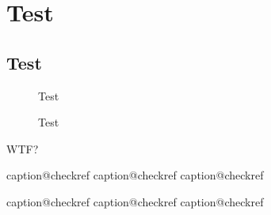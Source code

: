 \documentclass[
    a4paper, 
    oneside,
    ]{scrbook}
\begin{document}
\chapter{Test}  %
\section{Test}  %

\begin{figure}[!htbp]
    \centering
    \subfloat[{Test1}]
    {
        \rule{5cm}{2cm}
        \label{subfig:Test1_1}

        \hfill

        \rule{5cm}{2cm}
        \label{subfig:Test1_2}
    }
    \caption{Test}
    \label{fig:Test1}
\end{figure}

\newpage

\begin{figure}%
    \ContinuedFloat
    \centering
    \subfloat[{Test2}]
    {
        \rule{5cm}{2cm}
        \label{subfig:Test2_1}

        \hfill

        \rule{5cm}{2cm}
        \label{subfig:Test2_2}
    }
    \caption{Test}
    \label{fig:Test2}
\end{figure}

\newpage

\begin{center}
WTF?
\end{center}

\csname caption@checkref
\csname caption@checkref
\csname caption@checkref

\csname caption@checkref
\csname caption@checkref
\csname caption@checkref
\end{document}
